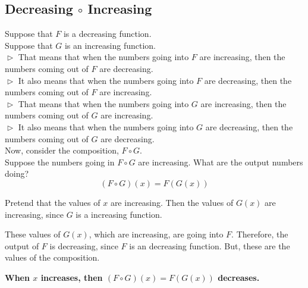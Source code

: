 \documentclass{ximera}
\begin{document}
\subsection*{Decreasing $\circ$ Increasing}


Suppose that $F$ is a decreasing function. \\
Suppose that $G$ is an increasing function. \\


$\vartriangleright$ That means that when the numbers going into $F$ are increasing, then the numbers coming out of $F$ are decreasing. \\

$\vartriangleright$ It also means that when the numbers going into $F$ are decreasing, then the numbers coming out of $F$ are increasing. \\



$\vartriangleright$ That means that when the numbers going into $G$ are increasing, then the numbers coming out of $G$ are increasing. \\


$\vartriangleright$ It also means that when the numbers going into $G$ are decreasing, then the numbers coming out of $G$ are decreasing. \\



Now, consider the composition, $F \circ G$. \\


Suppose the numbers going in $F \circ G$ are increasing.  What are the output numbers doing? \\




\[ (F \circ G)(x) = F(G(x)) \]


Pretend that the values of $x$ are increasing. Then the values of $G(x)$ are increasing, since $G$ is a increasing function.

These values of $G(x)$, which are increasing, are going into $F$.  Therefore, the output of $F$ is decreasing, since $F$ is an decreasing function.  But, these are the values of the composition.


\begin{center}
\textbf{\textcolor{red!70!black}{When $x$ increases, then $(F \circ G)(x) = F(G(x))$ decreases.}}
\end{center}
\end{document}
